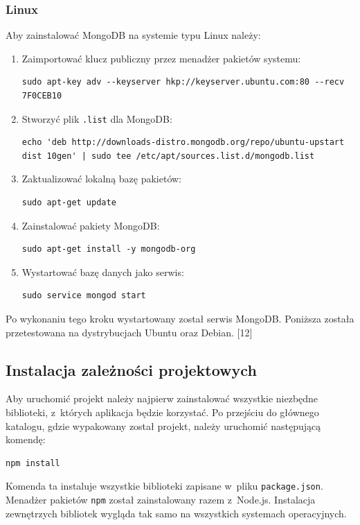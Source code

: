 \documentclass[12pt,a4paper,notitlepage]{article}
\begin{document}
\subsubsection{Linux}
Aby zainstalować MongoDB na systemie typu Linux należy: 
\begin{enumerate}
\item Zaimportować klucz publiczny przez menadżer pakietów systemu:
\begin{lstlisting}
sudo apt-key adv --keyserver hkp://keyserver.ubuntu.com:80 --recv 7F0CEB10
\end{lstlisting}

\item Stworzyć plik \texttt{.list} dla MongoDB:
\begin{lstlisting}
echo 'deb http://downloads-distro.mongodb.org/repo/ubuntu-upstart dist 10gen' | sudo tee /etc/apt/sources.list.d/mongodb.list
\end{lstlisting}

\item Zaktualizować lokalną bazę pakietów:
\begin{lstlisting}
sudo apt-get update
\end{lstlisting}

\item Zainstalować pakiety MongoDB:
\begin{lstlisting}
sudo apt-get install -y mongodb-org
\end{lstlisting}

\item Wystartować bazę danych jako serwis:
\begin{lstlisting}
sudo service mongod start
\end{lstlisting}
\end{enumerate}

Po wykonaniu tego kroku wystartowany został serwis MongoDB. Poniższa została przetestowana na dystrybucjach Ubuntu oraz Debian. [12]



\subsection{Instalacja zależności projektowych}
Aby uruchomić projekt należy najpierw zainstalować wszystkie niezbędne biblioteki, z~których aplikacja będzie korzystać. Po przejściu do głównego katalogu, gdzie wypakowany został projekt, należy uruchomić następującą komendę:
\begin{lstlisting}
npm install
\end{lstlisting}
Komenda ta instaluje wszystkie biblioteki zapisane w~pliku \texttt{package.json}. Menadżer pakietów \texttt{npm} został zainstalowany razem z~Node.js. Instalacja zewnętrzych bibliotek wygląda tak samo na wszystkich systemach operacyjnych.
\end{document}
